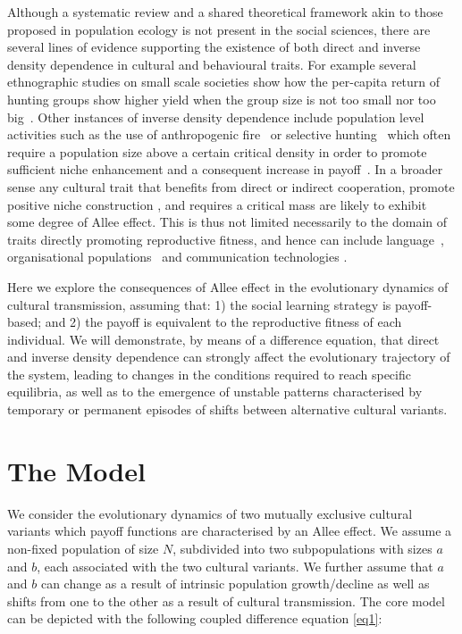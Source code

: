 \documentclass[review,authoryear]{elsarticle}
\begin{document}
Although a systematic review and a shared theoretical framework akin to those proposed in population ecology \citep{kramer_etal_2009} is not present in the social sciences, there are several lines of evidence supporting the existence of both direct and inverse density dependence in cultural and behavioural traits. For example several ethnographic studies on small scale societies show how the per-capita return of hunting groups show higher yield when the group size is not too small nor too big~\citep{hill_and_hawkes_1983,janssen_and_hill_2014}. Other instances of inverse density dependence include population level activities such as the use of anthropogenic fire~\citep{bird2013} or selective hunting~\citep{dods_2002} which often require a population size above a certain critical density in order to promote sufficient niche enhancement and a consequent increase in payoff~\citep{rowley-conwy_and_layton_2011}. In a broader sense any cultural trait that benefits from direct or indirect cooperation, 
promote positive niche construction \citep{vandermeer_2008}, and requires a critical mass \citep{rogers_2003} are likely to exhibit some degree of Allee effect. This is thus not limited necessarily to the domain of traits directly promoting reproductive fitness, and hence can include language~\citep{kandler2009}, organisational populations~\citep{caroll_and_hannan_1989} and communication technologies \citep{van_slyke_perceived_2007}.

Here we explore the consequences of Allee effect in the evolutionary dynamics of cultural transmission, assuming that: 1) the social learning strategy is payoff-based; and 2)  the payoff is equivalent to the reproductive fitness of each individual. We will demonstrate, by means of a difference equation, that direct and inverse density dependence can strongly affect the evolutionary trajectory of the system, leading to changes in the conditions required to reach specific equilibria, as well as to the emergence of unstable patterns characterised by temporary or permanent episodes of shifts between alternative cultural variants.

\section{The Model}
We consider the evolutionary dynamics of two mutually exclusive cultural variants which payoff functions are characterised by an Allee effect. We assume a non-fixed population of size $N$, subdivided into two subpopulations with sizes $a$ and $b$, each associated with the two cultural variants. We further assume that $a$ and $b$ can change as a result of intrinsic population growth/decline as well as shifts from one to the other as a result of cultural transmission. The core model can be depicted with the following coupled difference equation \eqref{eq1}:
\end{document}

